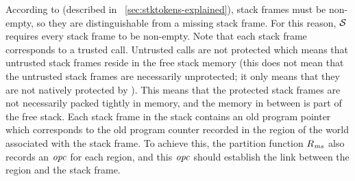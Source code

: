 \begin{jversion}
According to \stktokens{} (described in \sectionname~\ref{sec:stktokens-explained}), stack frames must be non-empty, so they are distinguishable from a missing stack frame.
For this reason, $\lrstk[]$ requires every stack frame to be non-empty.
Note that each stack frame corresponds to a trusted call.
Untrusted calls are not protected which means that untrusted stack frames reside in the free stack memory (this does not mean that the untrusted stack frames are necessarily unprotected; it only means that they are not natively protected by \stktokens{}).
This means that the protected stack frames are not necessarily packed tightly in memory, and the memory in between is part of the free stack.
Each stack frame in the \srccm{} stack contains an old program pointer which corresponds to the old program counter recorded in the region of the world associated with the stack frame.
To achieve this, the partition function $R_\ms$ also records an $\opc$ for each region, and this $\opc$ should establish the link between the region and the stack frame.


\end{jversion}
